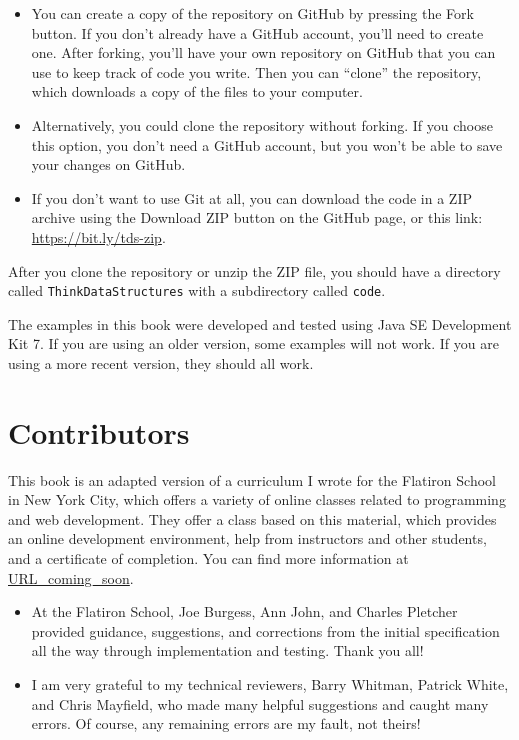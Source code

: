 \documentclass[12pt]{book}
\theoremstyle{exercise}
\begin{document}
\begin{itemize}

\item You can create a copy of the repository on GitHub by pressing
  the {\sf Fork} button.  If you don't already have a GitHub account,
  you'll need to create one.  After forking, you'll have your own
  repository on GitHub that you can use to keep track of code you
  write.  Then you can ``clone'' the repository, which downloads a
  copy of the files to your computer.

\item Alternatively, you could clone the repository without forking.
  If you choose this option, you don't need a GitHub account, but you
  won't be able to save your changes on GitHub.

\item If you don't want to use Git at all, you can download the code
  in a ZIP archive using the {\sf Download ZIP} button on the GitHub
  page, or this link: \url{https://bit.ly/tds-zip}.


\end{itemize}

After you clone the repository or unzip the ZIP file, you should have
a directory called {\tt ThinkDataStructures} with a subdirectory
called {\tt code}.

The examples in this book were developed and tested using Java SE
Development Kit 7.  If you are using an older version, some examples
will not work.  If you are using a more recent version, they should
all work.


\section*{Contributors}

This book is an adapted version of a curriculum I wrote for the
Flatiron School in New York City, which offers a variety of online
classes related to programming and web development.  They offer a
class based on this material, which provides an online development
environment, help from instructors and other students, and a
certificate of completion.  You can find more information at
\url{URL_coming_soon}.


\begin{itemize}

\item At the Flatiron School, Joe Burgess, Ann John, and Charles
  Pletcher provided guidance, suggestions, and corrections from the
  initial specification all the way through implementation and
  testing.  Thank you all!

\item I am very grateful to my technical reviewers, Barry Whitman,
  Patrick White, and Chris Mayfield, who made many helpful suggestions
  and caught many errors.  Of course, any remaining errors are my
  fault, not theirs!


\end{itemize}
\end{document}
